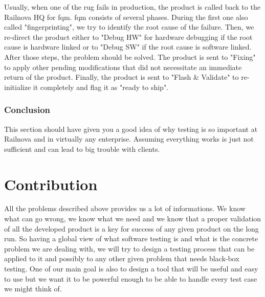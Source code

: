 \documentclass[12pt]{article}
\theoremstyle{definition}
\theoremstyle{definition}
\theoremstyle{remark}
\begin{document}
Usually, when one of the \gls{rug} fails in production, the product is called back to the Railnova HQ for \gls{fqm}. \gls{fqm} consists of several phases. During the first one also called "fingerprinting", we try to identify the root cause of the failure. Then, we re-direct the product either to "Debug HW" for hardware debugging if the root cause is hardware linked or to "Debug SW" if the root cause is software linked. After those steps, the problem should be solved. The product is sent to "Fixing" to apply other pending modifications that did not necessitate an immediate return of the product. Finally, the product is sent to "Flash \& Validate" to re-initialize it completely and flag it as "ready to ship".\\


\clearpage



\section{Conclusion}


This section should have given you a good idea of why testing is so important at Railnova and in virtually any enterprise. Assuming everything works is just not sufficient and can lead to big trouble with clients.



\clearpage
\part{Contribution}

All the problems described above provides us a lot of informations. We know what can go wrong, we know what we need and we know that a proper validation of all the developed product is a key for success of any given product on the long run. So having a global view of what software testing is and what is the concrete problem we are dealing with, we will try to design a testing process that can be applied to it and possibly to any other given problem that needs black-box testing. One of our main goal is also to design a tool that will be useful and easy to use but we want it to be powerful enough to be able to handle every test case we might think of.\\
\end{document}
